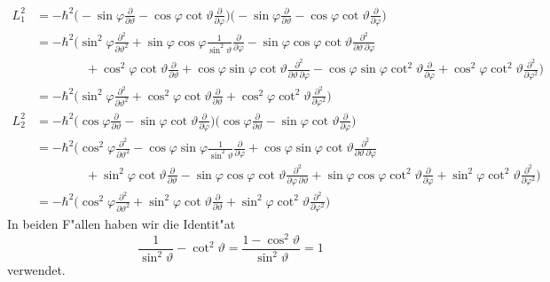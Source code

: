 \begin{align*}
L_1^2
&=-\hbar^2
\biggl(
-\sin\varphi\frac{\partial}{\partial\vartheta}
-\cos\varphi\cot\vartheta\frac{\partial}{\partial\varphi}
\biggr)
\biggl(
-\sin\varphi\frac{\partial}{\partial\vartheta}
-\cos\varphi\cot\vartheta\frac{\partial}{\partial\varphi}
\biggr)
\\
&=
-\hbar^2\biggl(
\sin^2\varphi\frac{\partial^2}{\partial \vartheta^2}
+
\sin\varphi\cos\varphi \frac{1}{\sin^2\vartheta}
\frac{\partial}{\partial\varphi}
-
\sin\varphi\cos\varphi\cot\vartheta\frac{\partial^2}{\partial\vartheta\,\partial\varphi}
\\
&\qquad\qquad
+\cos^2\varphi\cot\vartheta\frac{\partial}{\partial\vartheta}
+\cos\varphi\sin\varphi\cot\vartheta\frac{\partial^2}{\partial\vartheta\,\partial\varphi}
-\cos\varphi\sin\varphi\cot^2\vartheta\frac{\partial}{\partial\varphi}
+\cos^2\varphi\cot^2\vartheta\frac{\partial^2}{\partial\varphi^2}
\biggr)
\\
&=
-\hbar^2\biggl(
\sin^2\varphi\frac{\partial^2}{\partial\vartheta^2}
+
\cos^2\varphi\cot\vartheta\frac{\partial}{\partial\vartheta}
+
\cos^2\varphi\cot^2\vartheta\frac{\partial^2}{\partial\varphi^2}
\biggr)
\\
L_2^2
&=
-\hbar^2
\biggl(
\cos\varphi\frac{\partial}{\partial\vartheta}
-\sin\varphi\cot\vartheta\frac{\partial}{\partial\varphi}
\biggr)
\biggl(
\cos\varphi\frac{\partial}{\partial\vartheta}
-\sin\varphi\cot\vartheta\frac{\partial}{\partial\varphi}
\biggr)
\\
&=-\hbar^2
\biggl(
\cos^2\varphi\frac{\partial^2}{\partial\vartheta^2}
-\cos\varphi\sin\varphi\frac{1}{\sin^2\vartheta}\frac{\partial}{\partial\varphi}
+\cos\varphi\sin\varphi\cot\vartheta\frac{\partial^2}{\partial\vartheta\,\partial\varphi}
\\
&\qquad\qquad
+\sin^2\varphi\cot\vartheta\frac{\partial}{\partial\vartheta}
-\sin\varphi\cos\varphi\cot\vartheta\frac{\partial^2}{\partial\varphi\,\partial\vartheta}
+\sin\varphi\cos\varphi\cot^2\vartheta\frac{\partial}{\partial\varphi}
+\sin^2\varphi\cot^2\vartheta\frac{\partial^2}{\partial\varphi^2}
\biggr)
\\
&=
-\hbar^2\biggl(
\cos^2\varphi\frac{\partial^2}{\partial\vartheta^2}
+
\sin^2\varphi\cot\vartheta\frac{\partial}{\partial\vartheta}
+
\sin^2\varphi\cot^2\vartheta\frac{\partial^2}{\partial\varphi^2}
\biggr)
\end{align*}
In beiden F"allen haben wir die Identit"at
\[
\frac1{\sin^2\vartheta}
-
\cot^2\vartheta
=\frac{1-\cos^2\vartheta}{\sin^2\vartheta}=1
\]
verwendet.
